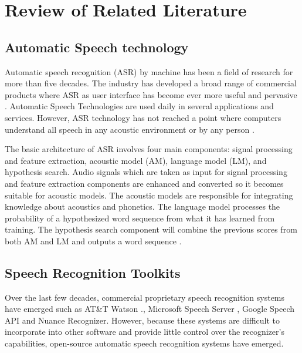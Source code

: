 
\chapter{Review of Related Literature}


\section{Automatic Speech technology}

Automatic speech recognition (ASR) by machine has been a field of research for more than five decades. The industry has developed a broad range of commercial products where ASR as user interface has become ever more useful and pervasive \cite{li2014overview}. Automatic Speech Technologies are used daily in several applications and services. However, ASR technology has not reached a point where computers understand all speech in any acoustic environment or by any person \cite{rabiner1993fundamentals}. 

The basic architecture of ASR involves four main components: signal processing and feature extraction, acoustic model (AM), language model (LM), and hypothesis search. Audio signals which are taken as input for signal processing and feature extraction components are enhanced and converted so it becomes suitable for acoustic models. The acoustic models are responsible for integrating knowledge about acoustics and phonetics. The language model processes the probability of a hypothesized word sequence from what it has learned from training. The hypothesis search component will combine the previous scores from both AM and LM and outputs a word sequence \cite{yu2016automatic}. 

\section{Speech Recognition Toolkits}
Over the last few decades, commercial proprietary speech recognition systems have emerged such as AT\&T Watson .\cite{goffin2005t}, Microsoft Speech Server \cite{dunn2007pro}, Google Speech API \cite{adorf2013web} and Nuance Recognizer. However, because these systems are difficult to incorporate into other software and provide little control over the recognizer's capabilities, open-source automatic speech recognition systems have emerged.

